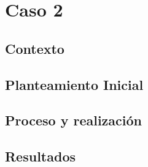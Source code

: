 \section{Caso 2}

\subsection{Contexto}
\subsection{Planteamiento Inicial}
\subsection{Proceso y realización}
\subsection{Resultados}
